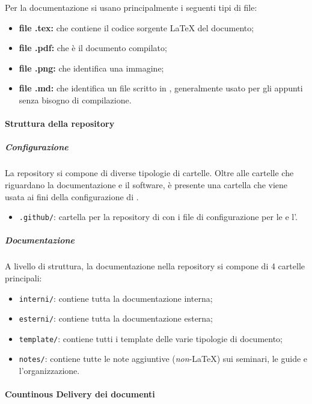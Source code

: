 			Per la documentazione si usano principalmente i seguenti tipi di file:
			\begin{itemize}
				\item \textbf{file .tex:} che contiene il codice sorgente \LaTeX{} del documento;
				\item \textbf{file .pdf:} che è il documento compilato; 
				\item \textbf{file .png:} che identifica una immagine;
				\item \textbf{file .md:} che identifica un file scritto in , generalmente usato per gli appunti senza bisogno di compilazione.
			\end{itemize}

		\paragraph{Struttura della repository}

		\subparagraph{Configurazione}

		La repository si compone di diverse tipologie di cartelle. Oltre alle cartelle che riguardano la documentazione e il software, è presente una cartella che viene usata ai fini della configurazione di .
		\begin{itemize}
			\item \verb!.github/!: cartella per la repository di  con i file di configurazione per le  e l'.
		\end{itemize}

		\subparagraph{Documentazione}

		A livello di struttura, la documentazione nella repository si compone di 4 cartelle principali:
		\begin{itemize}
			\item \verb!interni/!: contiene tutta la documentazione interna;
			\item \verb!esterni/!: contiene tutta la documentazione esterna;
			\item \verb!template/!: contiene tutti i template delle varie tipologie di documento;
			\item \verb!notes/!: contiene tutte le note aggiuntive (\textit{non}-\LaTeX{}) sui seminari, le guide e l'organizzazione.
		\end{itemize}

		\paragraph{Countinous Delivery dei documenti}
		\label{sec:cd_docs}


